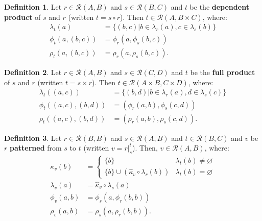 \documentclass{article}
\theoremstyle{definition}
\newtheorem{definition}{Definition}[subsection]
\theoremstyle{plain}
\def\rule{\mathcal{R}}
\begin{document}
\begin{definition}
  Let $ r \in \rule (A, B) $
  and $ s \in \rule (B, C) $
  and $ t $ be the \textbf{dependent product} of $ s $ and $ r $
  (written $ t = s \circ r $).
  Then $ t \in \rule (A, B \times C) $, where:
  \begin{align}
    \lambda_t (a)         & = \{ (b, c) | b \in \lambda_r (a), c \in \lambda_s (b) \} \\
       \phi_t (a, (b, c)) & =    \phi_r (a, \phi_s (b, c)) \\
       \rho_t (a, (b, c)) & =    \rho_r (a, \rho_s (b, c)).
  \end{align}
\end{definition}

\begin{definition}
  Let $ r \in \rule (A, B) $
  and $ s \in \rule (C, D) $
  and $ t $ be the \textbf{full product} of $ s $ and $ r $
  (written $ t = s \times r $).
  Then $ t \in \rule (A \times B, C \times D) $, where:
  \begin{align}
    \lambda_t ((a, c))         & = \{ (b, d) | b \in \lambda_r (a), d \in \lambda_s (c) \} \\
       \phi_t ((a, c), (b, d)) & = (\phi_r (a, b), \phi_s (c, d)) \\
       \rho_t ((a, c), (b, d)) & = (\rho_r (a, b), \rho_s (c, d)).
  \end{align}
\end{definition}

\begin{definition}
  Let $ r \in \rule (B, B) $
  and $ s \in \rule (A, B) $
  and $ t \in \rule (B, C) $
  and $ v $ be $ r $ \textbf{patterned} from $ s $ to $ t $
  (written $ v = r \rvert_{s}^{t} $).
  Then, $ v \in \rule (A, B) $, where:
  \begin{align}
      \kappa_v (b) & = \begin{cases}
                         \{ b \}                                               & \lambda_t (b) \neq \varnothing \\
                         \{ b \} \cup (\widehat{\kappa}_v \circ \lambda_r (b)) & \lambda_t (b) =    \varnothing
                       \end{cases} \\
  \lambda_v (a)    & = \widehat{\kappa}_v \circ \lambda_s (a) \\
     \phi_v (a, b) & = \phi_s (a, \phi_r (b, b)) \\
     \rho_v (a, b) & = \rho_s (a, \rho_r (b, b)).
  \end{align}
\end{definition}
\end{document}

